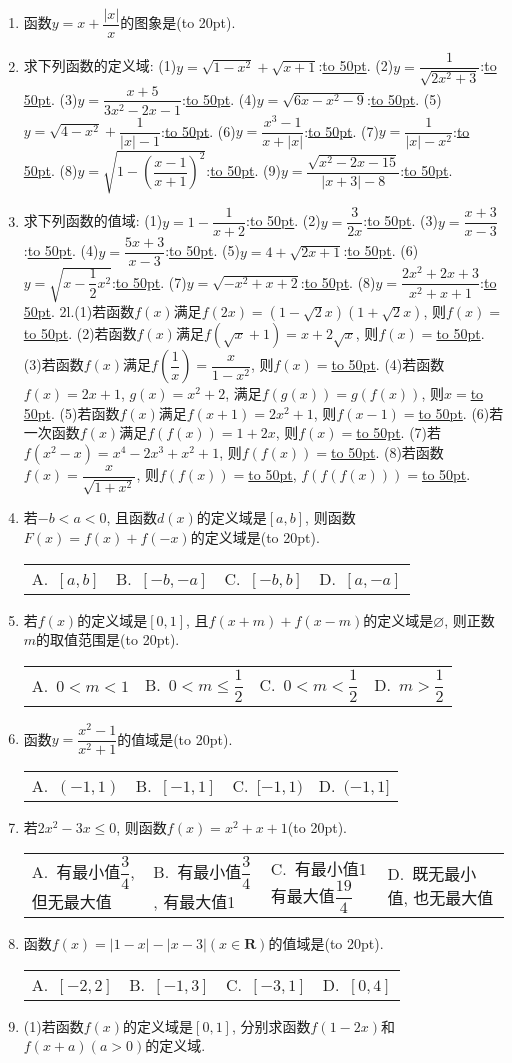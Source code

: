 \documentclass[10pt,a4paper]{article}
\newcommand{\blank}[1]{\underline{\hbox to #1pt{}}}
\newcommand{\bracket}[1]{(\hbox to #1pt{})}
\newcommand{\fourch}[4]{\par\begin{tabular}{p{.23\textwidth}p{.23\textwidth}p{.23\textwidth}p{.23\textwidth}}
A.~#1 &B.~#2& C.~#3& D.~#4
\end{tabular}}
\begin{document}
\begin{enumerate}[1.]
    \item 函数$y=x+\dfrac{|x|}x$的图象是\bracket{20}.
    \item 求下列函数的定义域:
    (1)$y=\sqrt{1-{x^2}}+\sqrt{x+1}$:\blank{50}.
    (2)$y=\dfrac 1{\sqrt{2{x^2}+3}}$:\blank{50}.
    (3)$y=\dfrac{x+5}{3{x^2}-2x-1}$:\blank{50}.
    (4)$y=\sqrt{6x-{x^2}-9}$:\blank{50}.
    (5)$y=\sqrt{4-{x^2}}+\dfrac 1{|x|-1}$:\blank{50}.
    (6)$y=\dfrac{{x^3}-1}{x+|x|}$:\blank{50}.
    (7)$y=\dfrac 1{|x|-{x^2}}$:\blank{50}.
    (8)$y=\sqrt{1-(\dfrac{x-1}{x+1})^2}$:\blank{50}.
    (9)$y=\dfrac{\sqrt{{x^2}-2x-15}}{|x+3|-8}$:\blank{50}.
    \item 求下列函数的值域:
    (1)$y=1-\dfrac 1{x+2}$:\blank{50}.				(2)$y=\dfrac 3{2x}$:\blank{50}.
    (3)$y=\dfrac{x+3}{x-3}$:\blank{50}.					(4)$y=\dfrac{5x+3}{x-3}$:\blank{50}.
    (5)$y=4+\sqrt{2x+1}$:\blank{50}.				(6)$y=\sqrt{x-\dfrac 12{x^2}}$:\blank{50}.
    (7)$y=\sqrt{-{x^2}+x+2}$:\blank{50}.			(8)$y=\dfrac{2{x^2}+2x+3}{{x^2}+x+1}$:\blank{50}.
    2l.(1)若函数$f(x)$满足$f(2x)=(1-\sqrt 2x)(1+\sqrt 2x)$, 则$f(x)=$\blank{50}.
    (2)若函数$f(x)$满足$f(\sqrt x+1)=x+2\sqrt x$, 则$f(x)=$\blank{50}.
    (3)若函数$f(x)$满足$f(\dfrac 1x)=\dfrac x{1-{x^2}}$, 则$f(x)=$\blank{50}.
    (4)若函数$f(x)=2x+1$, $g(x)=x^2+2$, 满足$f(g(x))=g(f(x))$, 则$x=$\blank{50}.
    (5)若函数$f(x)$满足$f(x+1)=2x^2+1$, 则$f(x-1)=$\blank{50}.
    (6)若一次函数$f(x)$满足$f(f(x))=1+2x$, 则$f(x)=$\blank{50}.
    (7)若$f(x^2-x)=x^4-2x^3+x^2+1$, 则$f(f(x))=$\blank{50}.
    (8)若函数$f(x)=\dfrac x{\sqrt{1+{x^2}}}$, 则$f(f(x))=$\blank{50}, $f(f(f(x)))=$\blank{50}.
    \item 若$-b<a<0$, 且函数$d(x)$的定义域是$[ a,b ]$, 则函数$F(x)=f(x)+f(-x)$的定义域是\bracket{20}.
    \fourch{$[ a,b ]$}{$[ -b,-a ]$}{$[ -b,b ]$}{$[ a,-a ]$}
    \item 若$f(x)$的定义域是$[ 0,1 ]$, 且$f(x+m)+f(x-m)$的定义域是$\varnothing$, 则正数$m$的取值范围是\bracket{20}.
    \fourch{$0<m<1$}{$0<m\le \dfrac 12$}{$0<m<\dfrac 12$}{$m>\dfrac 12$}
    \item 函数$y=\dfrac{{x^2}-1}{{x^2}+1}$的值域是\bracket{20}.
    \fourch{$(-1,1)$}{$[ -1,1 ]$}{$[ -1,1)$}{$(-1,1 ]$}
    \item 若$2x^2-3x\le 0$, 则函数$f(x)=x^2+x+1$\bracket{20}.
    \fourch{有最小值$\dfrac 34$, 但无最大值}{有最小值$\dfrac 34$, 有最大值1}{有最小值1有最大值$\dfrac{19}4$}{既无最小值, 也无最大值}
    \item 函数$f(x)=|1-x|-|x-3|(x\in \mathbf{R})$的值域是\bracket{20}.
    \fourch{$[ -2,2 ]$}{$[ -1,3 ]$}{$[ -3,1 ]$}{$[ 0,4 ]$}
    \item (1)若函数$f(x)$的定义域是$[ 0,1 ]$, 分别求函数$f(1-2x)$和$f(x+a)(a>0)$的定义域.

\end{enumerate}
\end{document}
